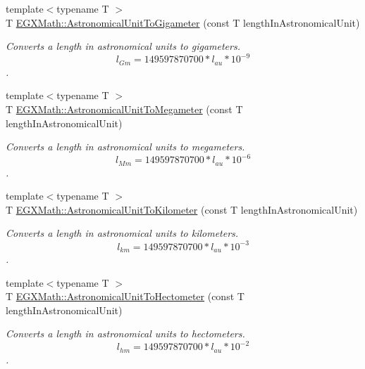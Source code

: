 \begin{DoxyCompactItemize}
{\footnotesize template$<$typename T $>$ }\\T \mbox{\hyperlink{group___e_g_x_math-_conversions-_length_conversions-_astronomical-_astronomical_unit-_s_i_ga8f063e63221d46cfb027d43bf3a03aa3}{E\+G\+X\+Math\+::\+Astronomical\+Unit\+To\+Gigameter}} (const T length\+In\+Astronomical\+Unit)
\begin{DoxyCompactList}\small\item\em Converts a length in astronomical units to gigameters. \[ l_{Gm}=149597870700 * l_{au} * 10^{-9} \]. \end{DoxyCompactList}\item 
{\footnotesize template$<$typename T $>$ }\\T \mbox{\hyperlink{group___e_g_x_math-_conversions-_length_conversions-_astronomical-_astronomical_unit-_s_i_ga0b4cbc4fcc40a26497debeba1f4049cd}{E\+G\+X\+Math\+::\+Astronomical\+Unit\+To\+Megameter}} (const T length\+In\+Astronomical\+Unit)
\begin{DoxyCompactList}\small\item\em Converts a length in astronomical units to megameters. \[ l_{Mm}=149597870700 * l_{au} * 10^{-6} \]. \end{DoxyCompactList}\item 
{\footnotesize template$<$typename T $>$ }\\T \mbox{\hyperlink{group___e_g_x_math-_conversions-_length_conversions-_astronomical-_astronomical_unit-_s_i_ga54770b9bf59a390a3f60ab04064c4198}{E\+G\+X\+Math\+::\+Astronomical\+Unit\+To\+Kilometer}} (const T length\+In\+Astronomical\+Unit)
\begin{DoxyCompactList}\small\item\em Converts a length in astronomical units to kilometers. \[ l_{km}=149597870700 * l_{au} * 10^{-3} \]. \end{DoxyCompactList}\item 
{\footnotesize template$<$typename T $>$ }\\T \mbox{\hyperlink{group___e_g_x_math-_conversions-_length_conversions-_astronomical-_astronomical_unit-_s_i_gab57dd2b64ec8d8e484741dd2459222c7}{E\+G\+X\+Math\+::\+Astronomical\+Unit\+To\+Hectometer}} (const T length\+In\+Astronomical\+Unit)
\begin{DoxyCompactList}\small\item\em Converts a length in astronomical units to hectometers. \[ l_{hm}=149597870700 * l_{au} * 10^{-2} \]. \end{DoxyCompactList}\item 

\end{DoxyCompactItemize}
